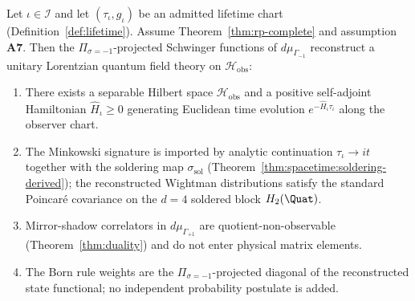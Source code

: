 \begin{theorem}
\label{thm:qm-derived}
Let $\iota\in\mathcal{I}$ and let $(\tau_\iota,g_\iota)$ be an admitted lifetime
chart (Definition~\ref{def:lifetime}). Assume Theorem~\ref{thm:rp-complete} and
assumption \textbf{A7}. Then the $\Pi_{\sigma=-1}$-projected Schwinger
functions of $d\mu_{\Gamma_{-1}}$ reconstruct a unitary Lorentzian quantum
field theory on $\mathcal{H}_{\mathrm{obs}}$:
\begin{enumerate}[label=(\roman*),leftmargin=*]
  \item There exists a separable Hilbert space $\mathcal{H}_{\mathrm{obs}}$ and
    a positive self-adjoint Hamiltonian $\hat H_\iota\ge 0$ generating
    Euclidean time evolution $e^{-\hat H_\iota\tau_\iota}$ along the observer
    chart.
  \item The Minkowski signature is imported by analytic continuation
    $\tau_\iota\to i t$ together with the soldering map
    $\sigma_{\mathrm{sol}}$ (Theorem~\ref{thm:spacetime:soldering-derived});
    the reconstructed Wightman distributions satisfy the standard
    Poincar\'e covariance on the $d=4$ soldered block $H_2(\Quat)$.
  \item Mirror-shadow correlators in $d\mu_{\Gamma_{+1}}$ are
    quotient-non-observable (Theorem~\ref{thm:duality}) and do not enter
    physical matrix elements.
  \item The Born rule weights are the $\Pi_{\sigma=-1}$-projected diagonal of
    the reconstructed state functional; no independent probability postulate is
    added.
\end{enumerate}
\end{theorem}

